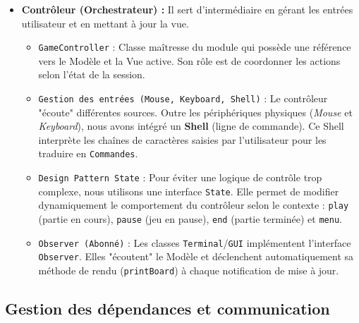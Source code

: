 \documentclass[11pt,a4paper]{article}
\begin{document}
\begin{itemize}
\begin{itemize}
        Ce découpage permet de répondre à l'objectif de "basculer facilement" d'un mode à l'autre sans toucher au cœur du jeu.
    \end{itemize}

    \item \textbf{Contrôleur (Orchestrateur) :}
        Il sert d'intermédiaire en gérant les entrées utilisateur et en mettant à jour la vue.
    \begin{itemize}     
        \item \texttt{GameController} : Classe maîtresse du module qui possède une référence vers le Modèle et la Vue active. Son rôle est de coordonner les actions selon l'état de la session.
    
        \item \texttt{Gestion des entrées (Mouse, Keyboard, Shell)} : 
        Le contrôleur "écoute" différentes sources. Outre les périphériques physiques (\textit{Mouse} et \textit{Keyboard}), nous avons intégré un \textbf{Shell} (ligne de commande). Ce Shell interprète les chaînes de caractères saisies par l'utilisateur pour les traduire en \texttt{Commandes}.
    
        \item \texttt{Design Pattern State} : 
        Pour éviter une logique de contrôle trop complexe, nous utilisons une interface \texttt{State}. Elle permet de modifier dynamiquement le comportement du contrôleur selon le contexte : \texttt{play} (partie en cours), \texttt{pause} (jeu en pause), \texttt{end} (partie terminée) et \texttt{menu}.

        \item \texttt{Observer (Abonné)} : 
        Les classes \texttt{Terminal}/\texttt{GUI} implémentent l'interface \texttt{Observer}. Elles "écoutent" le Modèle et déclenchent automatiquement sa méthode de rendu (\texttt{printBoard}) à chaque notification de mise à jour.
        
    
    \end{itemize}
\end{itemize}

\subsection{Gestion des dépendances et communication}
\end{document}

